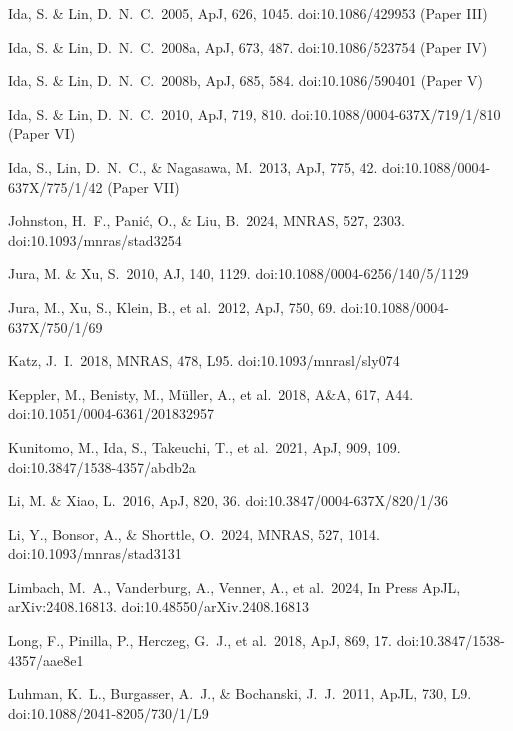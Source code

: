 \documentclass[useAMS,usenatbib]{mn2e}
\begin{document}
\begin{thebibliography}{99}
 Ida, S. \& Lin, D.~N.~C.\ 2005, ApJ, 626, 1045. doi:10.1086/429953 (Paper III)

 Ida, S. \& Lin, D.~N.~C.\ 2008a, ApJ, 673, 487. doi:10.1086/523754 (Paper IV)

 Ida, S. \& Lin, D.~N.~C.\ 2008b, ApJ, 685, 584. doi:10.1086/590401 (Paper V)

 Ida, S. \& Lin, D.~N.~C.\ 2010, ApJ, 719, 810. doi:10.1088/0004-637X/719/1/810 (Paper VI)

 Ida, S., Lin, D.~N.~C., \& Nagasawa, M.\ 2013, ApJ, 775, 42. doi:10.1088/0004-637X/775/1/42 (Paper VII)

 Johnston, H.~F., Pani{\'c}, O., \& Liu, B.\ 2024, MNRAS, 527, 2303. doi:10.1093/mnras/stad3254

 Jura, M. \& Xu, S.\ 2010, AJ, 140, 1129. doi:10.1088/0004-6256/140/5/1129

 Jura, M., Xu, S., Klein, B., et al.\ 2012, ApJ, 750, 69. doi:10.1088/0004-637X/750/1/69

 Katz, J.~I.\ 2018, MNRAS, 478, L95. doi:10.1093/mnrasl/sly074

 Keppler, M., Benisty, M., M{\"u}ller, A., et al.\ 2018, A\&A, 617, A44. doi:10.1051/0004-6361/201832957

 Kunitomo, M., Ida, S., Takeuchi, T., et al.\ 2021, ApJ, 909, 109. doi:10.3847/1538-4357/abdb2a

 Li, M. \& Xiao, L.\ 2016, ApJ, 820, 36. doi:10.3847/0004-637X/820/1/36

 Li, Y., Bonsor, A., \& Shorttle, O.\ 2024, MNRAS, 527, 1014. doi:10.1093/mnras/stad3131

 Limbach, M.~A., Vanderburg, A., Venner, A., et al.\ 2024, In Press ApJL, arXiv:2408.16813. doi:10.48550/arXiv.2408.16813

 Long, F., Pinilla, P., Herczeg, G.~J., et al.\ 2018, ApJ, 869, 17. doi:10.3847/1538-4357/aae8e1

 Luhman, K.~L., Burgasser, A.~J., \& Bochanski, J.~J.\ 2011, ApJL, 730, L9. doi:10.1088/2041-8205/730/1/L9


\end{thebibliography}
\end{document}
